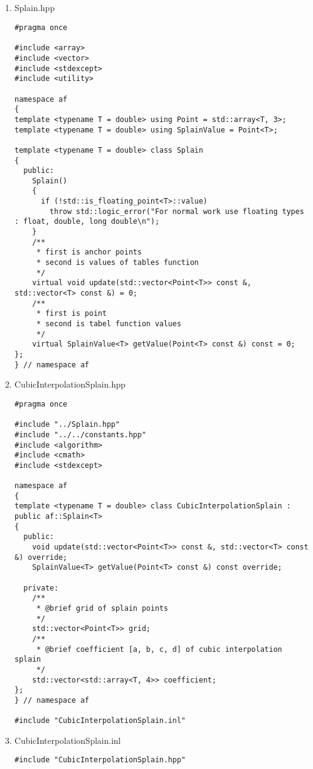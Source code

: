 \subsection{}
\begin{enumerate}
	\item Splain.hpp
	\begin{lstlisting}
#pragma once

#include <array>
#include <vector>
#include <stdexcept>
#include <utility>

namespace af
{
template <typename T = double> using Point = std::array<T, 3>;
template <typename T = double> using SplainValue = Point<T>;

template <typename T = double> class Splain
{
  public:
    Splain()
    {
      if (!std::is_floating_point<T>::value)
        throw std::logic_error("For normal work use floating types : float, double, long double\n");
    }
    /**
     * first is anchor points
     * second is values of tables function
     */
    virtual void update(std::vector<Point<T>> const &, std::vector<T> const &) = 0;
    /**
     * first is point
     * second is tabel function values
     */
    virtual SplainValue<T> getValue(Point<T> const &) const = 0;
};
} // namespace af

	\end{lstlisting}
	\item CubicInterpolationSplain.hpp
	\begin{lstlisting}
#pragma once

#include "../Splain.hpp"
#include "../../constants.hpp"
#include <algorithm>
#include <cmath>
#include <stdexcept>

namespace af
{
template <typename T = double> class CubicInterpolationSplain : public af::Splain<T>
{
  public:
    void update(std::vector<Point<T>> const &, std::vector<T> const &) override;
    SplainValue<T> getValue(Point<T> const &) const override;

  private:
    /**
     * @brief grid of splain points
     */
    std::vector<Point<T>> grid;
    /**
     * @brief coefficient [a, b, c, d] of cubic interpolation splain
     */
    std::vector<std::array<T, 4>> coefficient;
};
} // namespace af

#include "CubicInterpolationSplain.inl"
	\end{lstlisting}
	\item CubicInterpolationSplain.inl
	\begin{lstlisting}
#include "CubicInterpolationSplain.hpp"


\end{lstlisting}
\end{enumerate}
